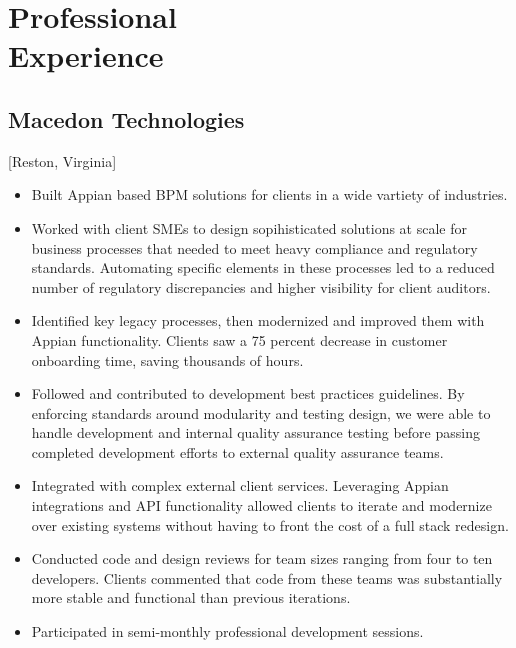 \documentclass{mycv}
\begin{document}
\maketitle%

\section{Professional \\ Experience}

\subsection{Macedon Technologies}[Reston, Virginia]
\begin{positions}
\end{positions}

\begin{itemize}
  \item Built Appian based BPM solutions for clients in a wide vartiety of industries.
  \item Worked with client SMEs to design sopihisticated solutions at scale for business processes that needed to meet heavy compliance and regulatory standards. Automating specific elements in these processes led to a reduced number  of regulatory discrepancies and higher visibility for client auditors.
  \item Identified key legacy processes, then modernized and improved them with Appian functionality. Clients saw a 75 percent decrease in customer onboarding time, saving thousands of hours.
  \item Followed and contributed to development best practices guidelines. By enforcing standards around modularity and testing design, we were able to handle development and internal quality assurance testing before passing completed development efforts to external quality assurance teams.
  \item Integrated with complex external client services. Leveraging Appian integrations and API functionality allowed clients to iterate and modernize over existing systems without having to front the cost of a full stack redesign.
  \item Conducted code and design reviews for team sizes ranging from four to ten developers. Clients commented that code from these teams was substantially more stable and functional than previous iterations.
  \item Participated in semi-monthly professional development sessions.
\end{itemize}
\end{document}
